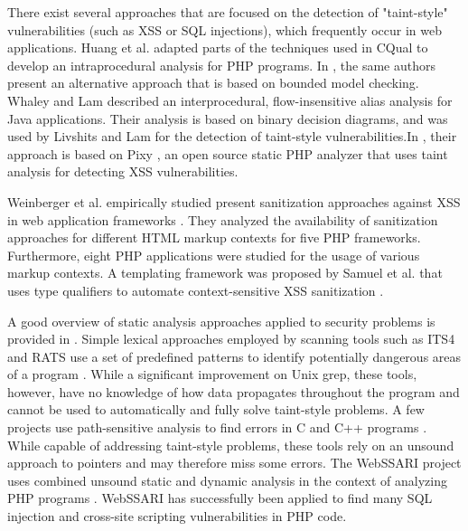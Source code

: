 There exist several approaches that are focused on the detection of "taint-style" vulnerabilities (such as XSS or SQL injections), which
frequently occur in web applications. Huang et al. \cite{ref_75_huang2004securing}
adapted parts of the techniques used in CQual to develop
an intraprocedural analysis for PHP programs. In \cite{ref_76_huang2004verifying}, the
same authors present an alternative approach that is based
on bounded model checking. Whaley and Lam \cite{ref_77_whaley2004cloning} described an interprocedural, flow-insensitive alias analysis for Java applications. Their analysis is based on binary decision diagrams, and was used by Livshits and Lam \cite{ref_78_livshits2005finding} for the detection of taint-style vulnerabilities.In \cite{ref_62_balzarotti2008saner}, their approach is based on Pixy \cite{ref_79_jovanovic2010static,ref_80_jovanovic2006precise}, an open
source static PHP analyzer that uses taint analysis for detecting XSS vulnerabilities.

Weinberger et al. empirically studied present sanitization
approaches against XSS in web application frameworks \cite{ref_105_weinberger2011systematic}.
They analyzed the availability of sanitization approaches for
different HTML markup contexts for five PHP frameworks.
Furthermore, eight PHP applications were studied for the
usage of various markup contexts. A templating framework
was proposed by Samuel et al. that uses type qualifiers
to automate context-sensitive XSS sanitization \cite{ref_106_samuel2011context}.

A good overview of static analysis approaches applied to security problems is provided in  \cite{ref_81_chess2004static}. Simple lexical approaches employed by scanning tools such as ITS4 and RATS use a set of predefined patterns to identify potentially dangerous areas of a program \cite{ref_82_wilander2002comparison}. While a significant improvement on Unix grep, these tools, however, have no knowledge of how data propagates throughout the program and cannot be used to automatically and fully solve taint-style problems.
A few projects use path-sensitive analysis to find errors in C and C++ programs \cite{ref_83_bush2000static,ref_84_hallem2002system,ref_85_livshits2003tracking}. While capable of addressing taint-style problems, these tools rely on an unsound approach to pointers and may therefore miss some errors. The WebSSARI project uses combined unsound static and dynamic analysis in the context of analyzing PHP programs \cite{ref_75_huang2004securing}. WebSSARI has successfully been applied to find many SQL injection and cross-site scripting vulnerabilities in PHP code.

